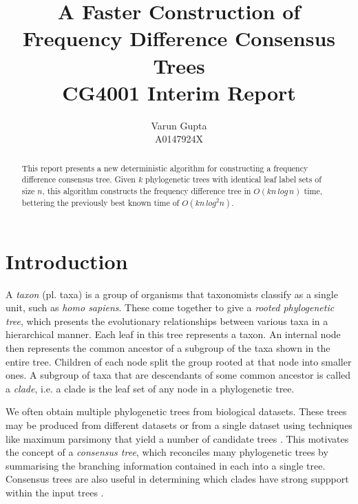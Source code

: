 \documentclass{article}
\title{A Faster Construction of Frequency Difference Consensus Trees\\CG4001 Interim Report}
\author{Varun Gupta\\A0147924X}
\begin{document}
    \maketitle

    \begin{abstract}
        This report presents a new deterministic algorithm for constructing a frequency difference consensus tree. Given $k$ phylogenetic trees with identical leaf label sets of size $n$, this algorithm constructs the frequency difference tree in $O(kn\,log\,n)$ time, bettering the previously best known time of $O(kn\,log^2n)$.
    \end{abstract}

    \section{Introduction}
    \label{sec:introduction}

    A \textit{taxon} (pl. taxa) is a group of organisms that taxonomists classify as a single unit, such as \textit{homo sapiens}. These come together to give a \textit{rooted phylogenetic tree}, which presents the evolutionary relationships between various taxa in a hierarchical manner. Each leaf in this tree represents a taxon. An internal node then represents the common ancestor of a subgroup of the taxa shown in the entire tree. Children of each node split the group rooted at that node into smaller ones. A subgroup of taxa that are descendants of some common ancestor is called a \textit{clade}, i.e. a clade is the leaf set of any node in a phylogenetic tree.

    We often obtain multiple phylogenetic trees from biological datasets. These trees may be produced from different datasets or from a single dataset using techniques like maximum parsimony that yield a number of candidate trees \cite{bryant1997hunting}. This motivates the concept of a \textit{consensus tree}, which reconciles many phylogenetic trees by summarising the branching information contained in each into a single tree. Consensus trees are also useful in determining which clades have strong suppport within the input trees \cite{felsenstein2004inferring}.
\end{document}
